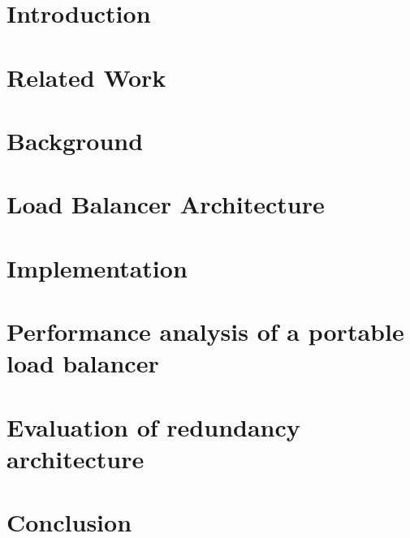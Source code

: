 
\chapter{Introduction}\label{chapter:introduction}
\graphicspath{{Manuscript/}}


\chapter{Related Work}\label{chapter:related}
\graphicspath{{Manuscript/}}


\chapter{Background}\label{chapter:background}
\graphicspath{{Manuscript/}}


\chapter{Load Balancer Architecture}\label{chapter:architecture}
\graphicspath{{Manuscript/}}


\chapter{Implementation}\label{chapter:implemetation}
\graphicspath{{Manuscript/}}


\chapter{Performance analysis of a portable load balancer}\label{chapter:evaluation}
\graphicspath{{./}}


\chapter{Evaluation of redundancy architecture}\label{chapter:evaluation}
\graphicspath{{Manuscript/}}


\chapter{Conclusion}\label{chapter:conclusion}
\graphicspath{{Manuscript/}}



